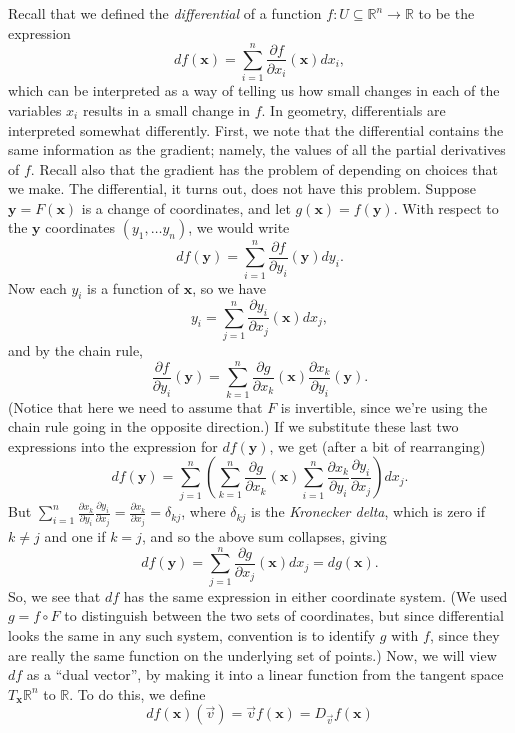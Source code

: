 \documentclass[12pt,letterpaper]{article}
\newcommand{\R}{\mathbb{R}}
\newcommand{\x}{\mathbf{x}}
\newcommand{\y}{\mathbf{y}}
\begin{document}
Recall that we defined the {\em differential} of a function $f:U\subseteq \R^n\to \R$ to be the expression
\[
 df(\x) = \sum_{i=1}^n \frac{\partial f}{\partial x_i}(\x)dx_i,
\]
which can be interpreted as a way of telling us how small changes in each of the variables $x_i$ results in a small change in $f$. In geometry, differentials are interpreted somewhat differently. First, we note that the differential contains the same information as the gradient; namely, the values of all the partial derivatives of $f$. Recall also that the gradient has the problem of depending on choices that we make. The differential, it turns out, does not have this problem. Suppose $\y=F(\x)$ is a change of coordinates, and let $g(\x)=f(\y)$. With respect to the $\y$ coordinates $(y_1,\ldots y_n)$, we would write
\[
 df(\y) = \sum_{i=1}^n\frac{\partial f}{\partial y_i}(\y)dy_i.
\]
Now each $y_i$ is a function of $\x$, so we have
\[
 y_i = \sum_{j=1}^n\frac{\partial y_i}{\partial x_j}(\x)dx_j,
\]
and by the chain rule,
\[
 \frac{\partial f}{\partial y_i}(\y) = \sum_{k=1}^n \frac{\partial g}{\partial x_k}(\x)\frac{\partial x_k}{\partial y_i}(\y).
\]
(Notice that here we need to assume that $F$ is invertible, since we're using the chain rule going in the opposite direction.)  If we substitute these last two expressions into the expression for $df(\y)$, we get (after a bit of rearranging)
\[
 df(\y) = \sum_{j=1}^n\left(\sum_{k=1}^n\frac{\partial g}{\partial x_k}(\x)\sum_{i=1}^n\frac{\partial x_k}{\partial y_i}\frac{\partial y_i}{\partial x_j}\right)dx_j.
\]
But $\displaystyle \sum_{i=1}^n \frac{\partial x_k}{\partial y_i}\frac{\partial y_i}{\partial x_j} = \frac{\partial x_k}{\partial x_j} = \delta_{kj}$, where $\delta_{kj}$ is the {\em Kronecker delta}, which is zero if $k\neq j$ and one if $k=j$, and so the above sum collapses, giving
\[
 df(\y) = \sum_{j=1}^n \frac{\partial g}{\partial x_j}(\x)dx_j = dg(\x).
\]
So, we see that $df$ has the same expression in either coordinate system. (We used $g=f\circ F$ to distinguish between the two sets of coordinates, but since differential looks the same in any such system, convention is to identify $g$ with $f$, since they are really the same function on the underlying set of points.)
Now, we will view $df$ as a ``dual vector'', by making it into a linear function from the tangent space $T_\x\R^n$ to $\R$. To do this, we define
\[
df(\x)(\vec{v}) = \vec{v} f(\x) = D_{\vec{v}}f(\x)                                                                                                                                                                                                                             
\]
\end{document}
